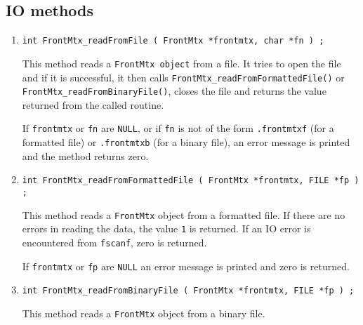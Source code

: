 \subsection{IO methods}
\label{subsection:FrontMtx:proto:IO}
\par
\begin{enumerate}
\item
\begin{verbatim}
int FrontMtx_readFromFile ( FrontMtx *frontmtx, char *fn ) ;
\end{verbatim}
\par
This method reads a {\tt FrontMtx object} from a file.
It tries to open the file and if it is successful, 
it then calls {\tt FrontMtx\_readFromFormattedFile()} or
{\tt FrontMtx\_readFromBinaryFile()}, 
closes the file
and returns the value returned from the called routine.
\par {}
If {\tt frontmtx} or {\tt fn} are {\tt NULL}, 
or if {\tt fn} is not of the form
{\tt *.frontmtxf} (for a formatted file) 
or {\tt *.frontmtxb} (for a binary file),
an error message is printed and the method returns zero.
\item
\begin{verbatim}
int FrontMtx_readFromFormattedFile ( FrontMtx *frontmtx, FILE *fp ) ;
\end{verbatim}
\par
This method reads a {\tt FrontMtx} object from a formatted file.
If there are no errors in reading the data, 
the value {\tt 1} is returned.
If an IO error is encountered from {\tt fscanf}, zero is returned.
\par {}
If {\tt frontmtx} or {\tt fp} are {\tt NULL} 
an error message is printed and zero is returned.
\item
\begin{verbatim}
int FrontMtx_readFromBinaryFile ( FrontMtx *frontmtx, FILE *fp ) ;
\end{verbatim}
This method reads a {\tt FrontMtx} object from a binary file.

\end{enumerate}
